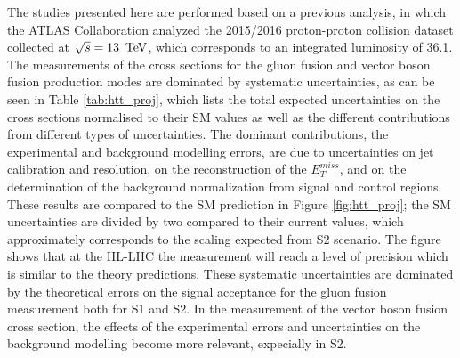 The studies presented here are performed based on a previous analysis, in which the ATLAS Collaboration analyzed the 2015/2016 proton-proton collision dataset collected at $\sqrt{s} = 13\,~\text{TeV}$, which corresponds to an integrated luminosity of 36.1\fbinv \cite{ATLAS-CONF-2018-021}. 
The measurements of the cross sections for the gluon fusion and vector boson fusion production modes are dominated by systematic uncertainties, as can be seen in  Table \ref{tab:htt_proj}, which  lists the total expected uncertainties on the cross sections normalised to their SM values as well as  the different contributions from different types of uncertainties. 
The dominant contributions, the experimental and background modelling errors, are due to uncertainties on jet calibration and resolution, on the reconstruction of the $E_{T}^{miss}$, and on the determination of the background normalization from signal and control regions.
These results are compared to the SM prediction in Figure \ref{fig:htt_proj}; the SM uncertainties are divided by two compared to their current values, which approximately corresponds to the scaling expected from S2  scenario. The figure shows that at the HL-LHC the measurement will reach a level of precision which is  similar to the theory predictions. These systematic uncertainties are dominated by the theoretical errors on the signal acceptance for the gluon fusion measurement both for S1 and S2. In the measurement of the vector boson fusion cross section, the effects of the experimental errors and uncertainties on the background modelling become more relevant, expecially in S2. 
